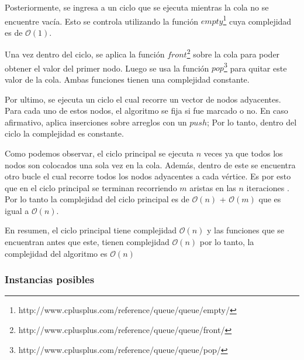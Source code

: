 Posteriormente, se ingresa a un ciclo que se ejecuta mientras la cola no se encuentre vacía. Esto se controla utilizando la función $empty$\footnote{http://www.cplusplus.com/reference/queue/queue/empty/} cuya complejidad es de $\mathcal{O}(1)$.
\newline

Una vez dentro del ciclo, se aplica la función $front$\footnote{http://www.cplusplus.com/reference/queue/queue/front/} sobre la cola para poder obtener el valor del primer nodo. Luego se usa la función $pop$\footnote{http://www.cplusplus.com/reference/queue/queue/pop/} para quitar este valor de la cola. Ambas funciones tienen una complejidad constante. \newline

Por ultimo, se ejecuta un ciclo el cual recorre un vector de nodos adyacentes. Para cada uno de estos nodos, el algoritmo se fija si fue marcado o no. En caso afirmativo, aplica inserciones sobre arreglos con un $push$; Por lo tanto, dentro del ciclo la complejidad es constante.

Como podemos observar, el ciclo principal se ejecuta $n$ veces ya que todos los nodos son colocados una sola vez en la cola. Además, dentro de este se encuentra otro bucle el cual recorre todos los nodos adyacentes a cada vértice. Es por esto que en el ciclo principal se terminan recorriendo $m$ aristas en las $n$ iteraciones . Por lo tanto la complejidad del ciclo principal es de $\mathcal{O}(n)$ + $\mathcal{O}(m)$ que es igual a $\mathcal{O}(n)$.
\newline

En resumen, el ciclo principal tiene complejidad $\mathcal{O}(n)$ y las funciones que se encuentran antes que este, tienen complejidad $\mathcal{O}(n)$ por lo tanto, la complejidad del algoritmo es $\mathcal{O}(n)$

\subsubsection{Instancias posibles}

